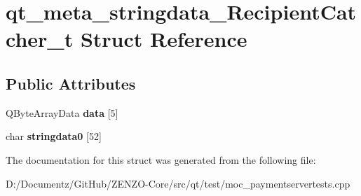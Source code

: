 \hypertarget{structqt__meta__stringdata___recipient_catcher__t}{}\section{qt\+\_\+meta\+\_\+stringdata\+\_\+\+Recipient\+Catcher\+\_\+t Struct Reference}
\label{structqt__meta__stringdata___recipient_catcher__t}
\subsection*{Public Attributes}
\begin{DoxyCompactItemize}
\item 
\mbox{\label{structqt__meta__stringdata___recipient_catcher__t_a05cbe686f83943fc6c142bc59c863653}} 
Q\+Byte\+Array\+Data {\bfseries data} \mbox{[}5\mbox{]}
\item 
\mbox{\label{structqt__meta__stringdata___recipient_catcher__t_aacfc6858934437136da271647794f0b0}} 
char {\bfseries stringdata0} \mbox{[}52\mbox{]}
\end{DoxyCompactItemize}


The documentation for this struct was generated from the following file\+:\begin{DoxyCompactItemize}
\item 
D\+:/\+Documentz/\+Git\+Hub/\+Z\+E\+N\+Z\+O-\/\+Core/src/qt/test/moc\+\_\+paymentservertests.\+cpp\end{DoxyCompactItemize}
